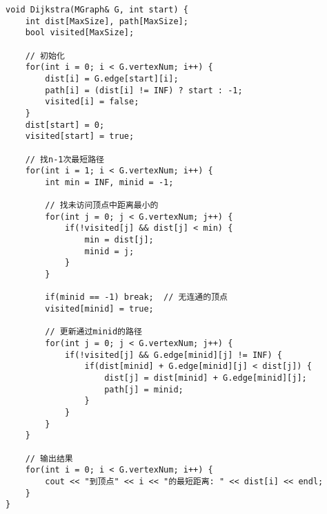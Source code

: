 \documentclass[12pt,a4paper]{amsart}
\begin{document}
\begin{center}
\end{center}

\begin{lstlisting}[caption=Dijkstra算法实现]
void Dijkstra(MGraph& G, int start) {
    int dist[MaxSize], path[MaxSize];
    bool visited[MaxSize];
    
    // 初始化
    for(int i = 0; i < G.vertexNum; i++) {
        dist[i] = G.edge[start][i];
        path[i] = (dist[i] != INF) ? start : -1;
        visited[i] = false;
    }
    dist[start] = 0;
    visited[start] = true;
    
    // 找n-1次最短路径
    for(int i = 1; i < G.vertexNum; i++) {
        int min = INF, minid = -1;
        
        // 找未访问顶点中距离最小的
        for(int j = 0; j < G.vertexNum; j++) {
            if(!visited[j] && dist[j] < min) {
                min = dist[j];
                minid = j;
            }
        }
        
        if(minid == -1) break;  // 无连通的顶点
        visited[minid] = true;
        
        // 更新通过minid的路径
        for(int j = 0; j < G.vertexNum; j++) {
            if(!visited[j] && G.edge[minid][j] != INF) {
                if(dist[minid] + G.edge[minid][j] < dist[j]) {
                    dist[j] = dist[minid] + G.edge[minid][j];
                    path[j] = minid;
                }
            }
        }
    }
    
    // 输出结果
    for(int i = 0; i < G.vertexNum; i++) {
        cout << "到顶点" << i << "的最短距离: " << dist[i] << endl;
    }
}
\end{lstlisting}
\end{document}
